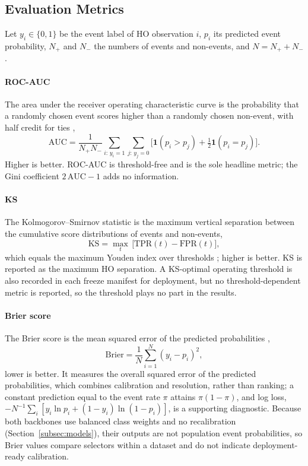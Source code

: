 \documentclass[final,5p,twocolumn]{elsarticle}
\newcommand{\AUC}{\mathrm{AUC}}
\newcommand{\KS}{\mathrm{KS}}
\newcommand{\TPR}{\mathrm{TPR}}
\newcommand{\FPR}{\mathrm{FPR}}
\begin{document}
\subsection{Evaluation Metrics}
\label{subsec:metrics}

Let $y_i\in\{0,1\}$ be the event label of HO observation $i$, $p_i$ its predicted event probability, $N_+$ and $N_-$ the numbers of events and non-events, and $N=N_++N_-$.

\paragraph{ROC-AUC}
The area under the receiver operating characteristic curve is the probability that a randomly chosen event scores higher than a randomly chosen non-event, with half credit for ties \cite{hanley1982},
\begin{equation}
    \AUC=\frac{1}{N_+N_-}\sum_{i:\,y_i=1}\sum_{j:\,y_j=0}\big[\mathbf{1}(p_i>p_j)+\tfrac12\mathbf{1}(p_i=p_j)\big].
    \label{eq:roc_auc}
\end{equation}
Higher is better. ROC-AUC is threshold-free and is the sole headline metric; the Gini coefficient $2\,\AUC-1$ adds no information.

\paragraph{KS}
The Kolmogorov--Smirnov statistic is the maximum vertical separation between the cumulative score distributions of events and non-events,
\begin{equation}
    \KS=\max_{t}\,\big[\TPR(t)-\FPR(t)\big],
    \label{eq:ks}
\end{equation}
which equals the maximum Youden index over thresholds \cite{youden1950}; higher is better. KS is reported as the maximum HO separation. A KS-optimal operating threshold is also recorded in each freeze manifest for deployment, but no threshold-dependent metric is reported, so the threshold plays no part in the results.

\paragraph{Brier score}
The Brier score is the mean squared error of the predicted probabilities \cite{brier1950},
\begin{equation}
    \mathrm{Brier}=\frac{1}{N}\sum_{i=1}^{N}(y_i-p_i)^2 ,
    \label{eq:brier}
\end{equation}
lower is better. It measures the overall squared error of the predicted probabilities, which combines calibration and resolution, rather than ranking; a constant prediction equal to the event rate $\pi$ attains $\pi(1-\pi)$, and log loss, $-N^{-1}\sum_i[y_i\ln p_i+(1-y_i)\ln(1-p_i)]$, is a supporting diagnostic. Because both backbones use balanced class weights and no recalibration (Section~\ref{subsec:models}), their outputs are not population event probabilities, so Brier values compare selectors within a dataset and do not indicate deployment-ready calibration.
\end{document}

